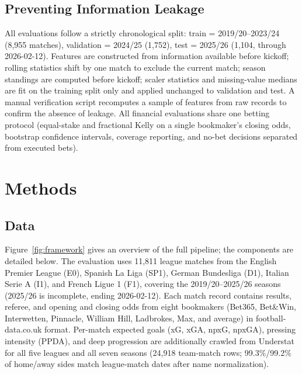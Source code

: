 \documentclass[10pt]{article}
\begin{document}
\subsection{Preventing Information Leakage}
\label{sec:protocol}
All evaluations follow a strictly chronological split: train = 2019/20--2023/24
(8{,}955 matches), validation = 2024/25 (1{,}752), test = 2025/26 (1{,}104,
through 2026-02-12). Features are constructed from information available before
kickoff; rolling statistics shift by one match to exclude the current match;
season standings are computed before kickoff; scaler statistics and
missing-value medians are fit on the training split only and applied unchanged
to validation and test. A manual verification script recomputes a sample of
features from raw records to confirm the absence of leakage. All financial
evaluations share one betting protocol (equal-stake and fractional Kelly on a
single bookmaker's closing odds, bootstrap confidence intervals, coverage
reporting, and no-bet decisions separated from executed bets).

\section{Methods}
\label{sec:methods}

\subsection{Data}
Figure~\ref{fig:framework} gives an overview of the full pipeline; the
components are detailed below. The evaluation uses 11{,}811 league matches from
the English Premier League (E0), Spanish La Liga (SP1), German Bundesliga (D1),
Italian Serie A (I1), and French Ligue 1 (F1), covering the 2019/20--2025/26
seasons (2025/26 is incomplete, ending 2026-02-12).
Each match record contains results, referee, and opening and closing odds from
eight bookmakers (Bet365, Bet\&Win, Interwetten, Pinnacle, William Hill,
Ladbrokes, Max, and average) in football-data.co.uk format. Per-match expected
goals (xG, xGA, npxG, npxGA), pressing intensity (PPDA), and deep progression
are additionally crawled from Understat for all five leagues and all seven
seasons (24{,}918 team-match rows; 99.3\%/99.2\% of home/away sides match
league-match dates after name normalization).
\end{document}
